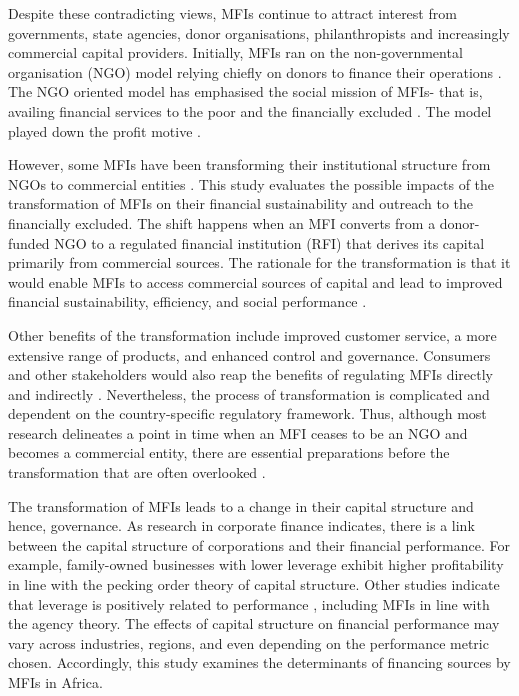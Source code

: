 \documentclass[a4paper, nobind]{templates/ociamthesis}
\begin{document}
Despite these contradicting views, MFIs continue to attract interest from governments, state agencies, donor organisations, philanthropists and increasingly commercial capital providers. Initially, MFIs ran on the non-governmental organisation (NGO) model relying chiefly on donors to finance their operations \autocite{d2017ngos}. The NGO oriented model has emphasised the social mission of MFIs- that is, availing financial services to the poor and the financially excluded \autocite{ashta2012compartamos}. The model played down the profit motive \autocite{ashta2012compartamos}.

However, some MFIs have been transforming their institutional structure from NGOs to commercial entities \autocite{d2017ngos}. This study evaluates the possible impacts of the transformation of MFIs on their financial sustainability and outreach to the financially excluded. The shift happens when an MFI converts from a donor-funded NGO to a regulated financial institution (RFI) that derives its capital primarily from commercial sources. The rationale for the transformation is that it would enable MFIs to access commercial sources of capital and lead to improved financial sustainability, efficiency, and social performance \autocite{louis2013financial}.

Other benefits of the transformation include improved customer service, a more extensive range of products, and enhanced control and governance\autocite{srnec2008transformation}. Consumers and other stakeholders would also reap the benefits of regulating MFIs directly \autocite{meagher2006microfinance} and indirectly \autocite{hartarska2007regulated}. Nevertheless, the process of transformation is complicated and dependent on the country-specific regulatory framework. Thus, although most research delineates a point in time when an MFI ceases to be an NGO and becomes a commercial entity, there are essential preparations before the transformation that are often overlooked \autocite{d2017ngos}.

The transformation of MFIs leads to a change in their capital structure and hence, governance. As research in corporate finance indicates, there is a link between the capital structure of corporations and their financial performance. For example, family-owned businesses with lower leverage exhibit higher profitability \autocite{hamid2015capital} in line with the pecking order theory of capital structure. Other studies indicate that leverage is positively related to performance \autocite{fosu2013capital,berger2006capital}, including MFIs \autocite{kar2012does} in line with the agency theory. The effects of capital structure on financial performance may vary across industries, regions, and even depending on the performance metric chosen. Accordingly, this study examines the determinants of financing sources by MFIs in Africa.
\end{document}
